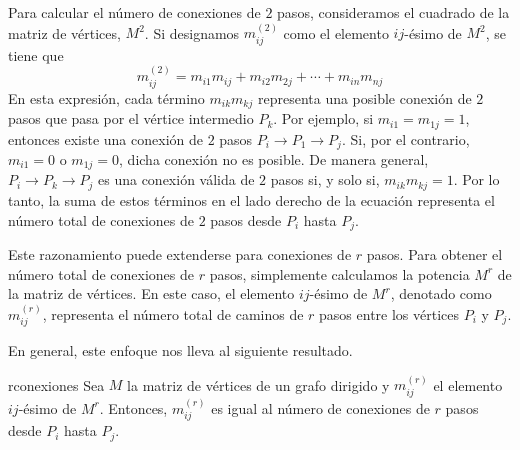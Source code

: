 Para calcular el número de conexiones de $2$ pasos, consideramos el cuadrado de la matriz de vértices, $M^2$. Si designamos $m_{ij}^{(2)}$ como el elemento $ij$-ésimo de $M^2$, se tiene que
\begin{equation}
    m_{ij}^{(2)} = m_{i1}m_{ij} + m_{i2}m_{2j} + \cdots + m_{in}m_{nj} \label{eq:grafos1}
\end{equation}
En esta expresión, cada término $m_{ik}m_{kj}$ representa una posible conexión de $2$ pasos que pasa por el vértice intermedio $P_k$. Por ejemplo, si $m_{i1} = m_{1j} = 1$, entonces existe una conexión de $2$ pasos $P_i \to P_1 \to P_j$. Si, por el contrario, $m_{i1} = 0$ o $m_{1j} = 0$, dicha conexión no es posible. De manera general, $P_i \to P_k \to P_j$ es una conexión válida de $2$ pasos si, y solo si, $m_{ik}m_{kj} = 1$. Por lo tanto, la suma de estos términos en el lado derecho de la ecuación representa el número total de conexiones de $2$ pasos desde $P_i$ hasta $P_j$.

Este razonamiento puede extenderse para conexiones de $r$ pasos. Para obtener el número total de conexiones de $r$ pasos, simplemente calculamos la potencia $M^r$ de la matriz de vértices. En este caso, el elemento $ij$-ésimo de $M^r$, denotado como $m_{ij}^{(r)}$, representa el número total de caminos de $r$ pasos entre los vértices $P_i$ y $P_j$.

En general, este enfoque nos lleva al siguiente resultado.

\begin{theorem}{}{rconexiones}
    Sea $M$ la matriz de vértices de un grafo dirigido y $m^{(r)}_{ij}$ el elemento $ij$-ésimo de $M^r$. Entonces, $m^{(r)}_{ij}$ es igual al número de conexiones de $r$ pasos desde $P_i$ hasta $P_j$.
\end{theorem}

